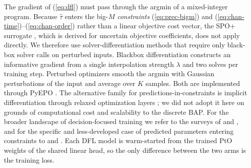The gradient of (\ref{eq:dfl}) must pass through the argmin of a mixed-integer
program. Because $\hat\tau$ enters the big-$M$ \emph{constraints}
(\ref{eq:prec-bigm}) and (\ref{eq:chan-time})--(\ref{eq:chan-order}) rather than
a linear objective cost vector, the SPO+ surrogate \citep{elmachtoub2022spo},
which is derived for uncertain objective coefficients, does not apply directly.
We therefore use solver-differentiation methods that require only black-box
solver calls on perturbed inputs. Blackbox differentiation
\citep{pogancic2020blackbox} constructs an informative gradient from a single
interpolation strength $\lambda$ and two solves per training step. Perturbed
optimizers \citep{berthet2020learning} smooth the argmin with Gaussian
perturbations of the input and average over $K$ samples. Both are implemented
through PyEPO \citep{tang2024pyepo}. The alternative family for
predictions-in-constraints is implicit differentiation through relaxed
optimization layers \citep{amos2017optnet, wilder2019melding, ferber2020mipaal};
we did not adopt it here on grounds of computational cost and scalability to the
discrete BAP. For the broader landscape of decision-focused training we refer to
the surveys of \citet{mandi2024decision} and \citet{kotary2021end}, and for the
specific and less-developed case of predicted parameters entering constraints to
\citet{hu2023twostage} and \citet{mandi2025feasibility}. Each DFL model is
warm-started from the trained PtO weights of the shared linear head, so the only
difference between the two arms is the training loss.
